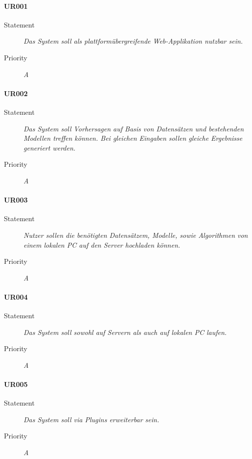 \paragraph{UR001}
\begin{description}
\item [Statement] \textit{Das System soll als plattformübergreifende \gls{Web-Applikation} nutzbar sein.}
\item [Priority] \textit{A}
\end{description}

\paragraph{UR002}
\begin{description}
\item[Statement] \textit{Das System soll Vorhersagen auf Basis von Datensätzen und bestehenden Modellen treffen können. Bei gleichen Eingaben sollen gleiche Ergebnisse generiert werden.}
\item[Priority] \textit{A}
\end{description}


\paragraph{UR003}
\begin{description}
\item[Statement] \textit{Nutzer sollen die benötigten Datensätzem, Modelle, sowie Algorithmen von einem lokalen PC auf den Server hochladen können.}
\item[Priority] \textit{A}
\end{description}

\paragraph{UR004}
\begin{description}
\item[Statement] \textit{Das System soll sowohl auf Servern als auch auf lokalen PC laufen.}
\item[Priority] \textit{A}
\end{description}

\paragraph{UR005}
\begin{description}
\item[Statement] \textit{Das System soll via \gls{Plugins} erweiterbar sein.}
\item[Priority] \textit{A}
\end{description}

